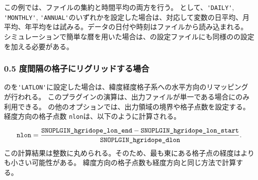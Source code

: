 この例では、ファイルの集約と時間平均の両方を行う。
として、\verb|'DAILY'|, \verb|'MONTHLY'|, \verb|'ANNUAL'|のいずれかを設定した場合は、対応して変数の日平均、月平均、年平均を\sno は試みる。データの日付や時刻はファイルから読み込まれる。
シミュレーションで簡単な暦を用いた場合は、\sno の設定ファイルにも同様のの設定を加える必要がある。

\subsubsection{0.5 度間隔の格子にリグリッドする場合}


のを\verb|'LATLON'|に設定した場合は、緯度経度格子系への水平方向のリマッピングが行われる。
このプラグインの演算は、出力ファイルが単一である場合にのみ利用できる。
の他のオプションでは、出力領域の境界や格子点数を設定する。
経度方向の格子点数 \verb|nlon|は、以下のように計算される。

\begin{eqnarray}
  \nmitemeq{nlon} = \frac{\nmitemeq{SNOPLGIN_hgridope_lon_end} - \nmitemeq{SNOPLGIN_hgridope_lon_start} }{\nmitemeq{SNOPLGIN_hgridope_dlon}} \nonumber.
\end{eqnarray}
\noindent
この計算結果は整数に丸められる。そのため、最も東にある格子点の経度はよりも小さい可能性がある。
緯度方向の格子点数も経度方向と同じ方法で計算する。

